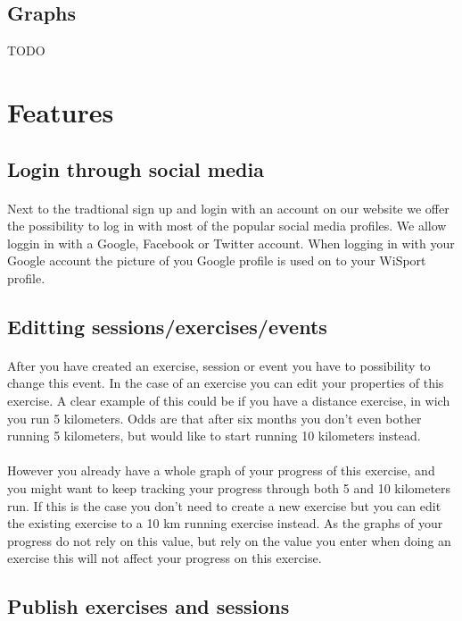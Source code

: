 \documentclass[11pt,a4paper]{scrartcl}
\begin{document}
\subsection{Graphs}
TODO

\section{Features}
\subsection{Login through social media}
\paragraph{}Next to the tradtional sign up and login with an account on our website we offer the possibility to log in with most of the popular social media profiles. We allow loggin in  with a Google, Facebook or Twitter account. When logging in with your Google account the picture of you Google profile is used on to your WiSport profile.

\subsection{Editting sessions/exercises/events}
\paragraph{}After you have created an exercise, session or event you have to possibility to change this event. In the case of an exercise you can edit your properties of this exercise. A clear example of this could be if you have a distance exercise, in wich you run 5 kilometers. Odds are that after six months you don't even bother running 5 kilometers, but would like to start running 10 kilometers instead.
\paragraph{}However you already have a whole graph of your progress of this exercise, and you might want to keep tracking your progress through both 5 and 10 kilometers run. If this is the case you don't need to create a new exercise but you can edit the existing exercise to a 10 km running exercise instead. As the graphs of your progress do not rely on this value, but rely on the value you enter when doing an exercise this will not affect your progress on this exercise.
\subsection{Publish exercises and sessions}
\end{document}
